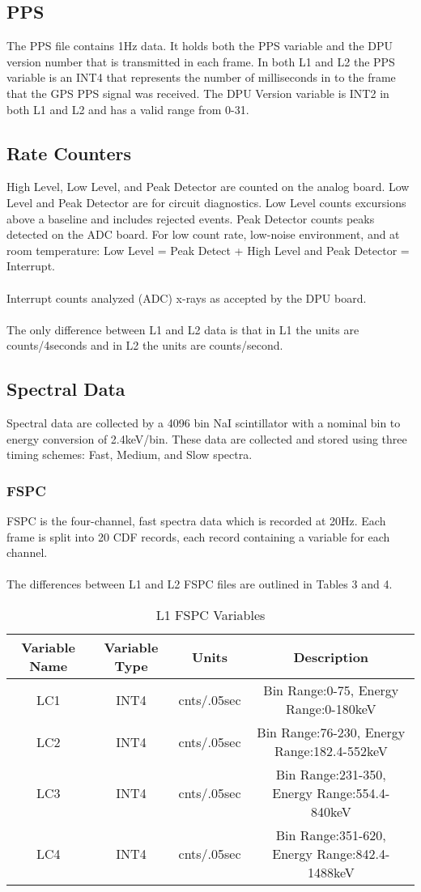 \documentclass{article}
\begin{document}
\subsection{PPS}
The PPS file contains 1Hz data. It holds both the PPS variable and the DPU version number that is transmitted in each frame. In both L1 and L2 the PPS variable is an INT4 that represents the number of milliseconds in to the frame that the GPS PPS signal was received. The DPU Version variable is INT2 in both L1 and L2 and has a valid range from 0-31.

\subsection{Rate Counters}
High Level, Low Level, and Peak Detector are counted on the analog board. Low Level and Peak Detector are for circuit diagnostics. Low Level counts excursions above a baseline and includes rejected events. Peak Detector counts peaks detected on the ADC board. For low count rate, low-noise environment, and at room temperature: Low Level = Peak Detect + High Level and Peak Detector = Interrupt.\\\\
Interrupt counts analyzed (ADC) x-rays as accepted by the DPU board.\\\\
The only difference between L1 and L2 data is that in L1 the units are counts/4seconds and in L2 the units are counts/second.

\subsection{Spectral Data}
Spectral data are collected by a 4096 bin NaI scintillator with a nominal bin to energy conversion of 2.4keV/bin. These data are collected and stored using three timing schemes: Fast, Medium, and Slow spectra.

\subsubsection{FSPC}
FSPC is the four-channel, fast spectra data which is recorded at 20Hz. Each frame is split into 20 CDF records, each record containing a variable for each channel.\\\\
The differences between L1 and L2 FSPC files are outlined in Tables 3 and 4.

\begin{table}[H]
\caption{L1 FSPC Variables}
\begin{tabular}{|c|c|c|c|}
\hline
Variable Name&Variable Type & Units & Description\\ \hline
LC1&INT4&cnts/.05sec&Bin Range:0-75, Energy Range:0-180keV\\
LC2&INT4&cnts/.05sec&Bin Range:76-230, Energy Range:182.4-552keV\\
LC3&INT4&cnts/.05sec&Bin Range:231-350, Energy Range:554.4-840keV\\
LC4&INT4&cnts/.05sec&Bin Range:351-620, Energy Range:842.4-1488keV\\
\hline
\end{tabular}
\end{table}
\end{document}
